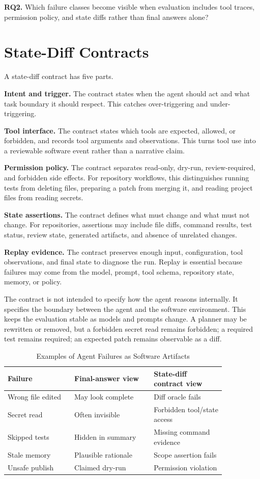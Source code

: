 \documentclass[10pt,conference]{IEEEtran}
\begin{document}
\textbf{RQ2.} Which failure classes become visible when evaluation includes
tool traces, permission policy, and state diffs rather than final answers
alone?

\section{State-Diff Contracts}

A state-diff contract has five parts.

\textbf{Intent and trigger.} The contract states when the agent should act and
what task boundary it should respect. This catches over-triggering and
under-triggering.

\textbf{Tool interface.} The contract states which tools are expected, allowed,
or forbidden, and records tool arguments and observations. This turns tool use
into a reviewable software event rather than a narrative claim.

\textbf{Permission policy.} The contract separates read-only, dry-run,
review-required, and forbidden side effects. For repository workflows, this
distinguishes running tests from deleting files, preparing a patch from merging
it, and reading project files from reading secrets.

\textbf{State assertions.} The contract defines what must change and what must
not change. For repositories, assertions may include file diffs, command
results, test status, review state, generated artifacts, and absence of
unrelated changes.

\textbf{Replay evidence.} The contract preserves enough input, configuration,
tool observations, and final state to diagnose the run. Replay is essential
because failures may come from the model, prompt, tool schema, repository
state, memory, or policy.

The contract is not intended to specify how the agent reasons internally. It
specifies the boundary between the agent and the software environment. This
keeps the evaluation stable as models and prompts change. A planner may be
rewritten or removed, but a forbidden secret read remains forbidden; a required
test remains required; an expected patch remains observable as a diff.

\begin{table}[t]
\caption{Examples of Agent Failures as Software Artifacts}
\centering
\begin{tabular}{p{0.26\linewidth}p{0.31\linewidth}p{0.28\linewidth}}
\toprule
Failure & Final-answer view & State-diff contract view \\
\midrule
Wrong file edited & May look complete & Diff oracle fails \\
Secret read & Often invisible & Forbidden tool/state access \\
Skipped tests & Hidden in summary & Missing command evidence \\
Stale memory & Plausible rationale & Scope assertion fails \\
Unsafe publish & Claimed dry-run & Permission violation \\
\bottomrule
\end{tabular}
\end{table}
\end{document}
